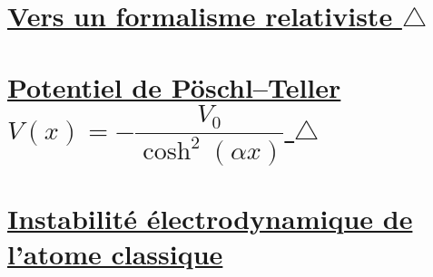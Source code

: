 \documentclass[a4paper,10pt]{report}
\begin{document}
	
	\newpage \section{\hyperref[subsec:Dirac]{Vers un formalisme relativiste $\triangle$}}\label{subsec:correctionDirac}
	
	\newpage \section{\hyperref[subsec:Potentiel]{Potentiel de Pöschl--Teller $V(x) = -\dfrac{V_0}{\cosh^2(\alpha x)}$ $\triangle$}}\label{subsec:correctionPotentiel}
		
	\newpage \section{\hyperref[subsec:Instable]{Instabilité électrodynamique de l'atome classique}}\label{subsec:correctionInstable}
\end{document}
